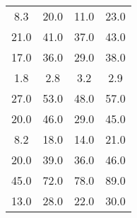\documentclass{article}
\begin{document}
\begin{tabular}{cccc} 8.3 & 20.0 & 11.0 & 23.0\\ 21.0 & 41.0 & 37.0 & 43.0\\ 17.0 & 36.0 & 29.0 & 38.0\\ 1.8 & 2.8 & 3.2 & 2.9\\ 27.0 & 53.0 & 48.0 & 57.0\\ 20.0 & 46.0 & 29.0 & 45.0\\ 8.2 & 18.0 & 14.0 & 21.0\\ 20.0 & 39.0 & 36.0 & 46.0\\ 45.0 & 72.0 & 78.0 & 89.0\\ 13.0 & 28.0 & 22.0 & 30.0 \end{tabular}
\end{document}
